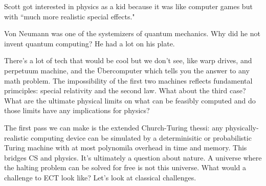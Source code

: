 Scott got interested in physics as a kid because it was like computer games but with ``much more realistic special effects."

Von Neumann was one of the systemizers of quantum mechanics. Why did he not invent quantum computing? He had a lot on his plate.

There's a lot of tech that would be cool but we don't see, like warp drives, and perpetuum machine, and the \"Ubercomputer which tells you the answer to any math problem.
The impossibility of the first two machines reflects fundamental primciples: special relativity and the second law. What about the third case? What are the ultimate physical limits on what can be feasibly computed and do those limits have any implications for physics?

The first pass we can make is the extended Church-Turing thessi: any physically-realistic computing device can be simulated by a determinisitic or probabilistic Turing machine with at most polynomila overhead in time and memory.
This bridges CS and physics. It's ultimately a question about nature. A universe where the halting problem can be solved for free is not this universe. 
What would a challenge to ECT look like? Let's look at classical challenges.
